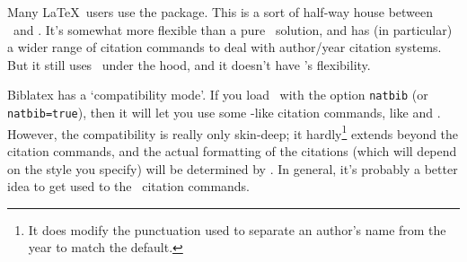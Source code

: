 
Many \LaTeX\ users use the  package. This is a sort of
half-way house between \bibtex\ and \biblatex. It's somewhat more
flexible than a pure \bibtex\ solution, and has (in particular) a
wider range of citation commands to deal with author\slash year
citation systems. But it still uses \bibtex\ under the hood, and it
doesn't have \biblatex's flexibility.

Biblatex has a  `compatibility mode'.
If you load \biblatex\ with the option \texttt{natbib} (or
\texttt{natbib\allowbreak =\allowbreak true}), then it will let you
use some -like citation commands, like  and
. However, the compatibility is really only skin-deep;
it hardly\footnote{It does modify the punctuation used to separate an
author's name from the year to match the  default.}
extends beyond the citation commands, and the actual formatting of the
citations (which will depend on the style you specify) will be
determined by \biblatex. In general, it's probably a better idea to
get used to the \biblatex\ citation commands.
